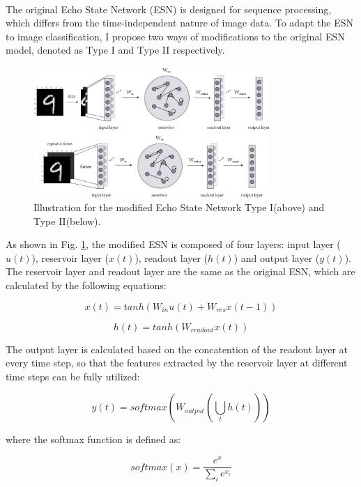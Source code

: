 \documentclass{article}
\newcommand{\upcite}[1]{\textsuperscript{\cite{#1}}} %
\begin{document}
The original Echo State Network \upcite{ESN} (ESN) is designed for sequence processing, which differs from the time-independent nature of 
image data. To adapt the ESN to image classification, I propose two ways of modifications to the original ESN model, 
denoted as Type I and Type II respectively.

\begin{figure}[htbp]
    \centering
    \includegraphics[width=0.8\textwidth]{assets/esn.jpg}
    \caption{Illustration for the modified Echo State Network Type I(above) and Type II(below).}
    \label{fig:esn}
\end{figure}

As shown in Fig. \ref{fig:esn}, the modified ESN is composed of four layers: input layer ($u(t)$), reservoir layer ($x(t)$), 
readout layer ($h(t)$) and output layer ($y(t)$).
The reservoir layer and readout layer are the same as the original ESN, which are calculated by the following equations:

\begin{equation}
    x(t) = tanh(W_{in}u(t) + W_{res}x(t-1))
\end{equation}

\begin{equation}
    h(t) = tanh(W_{readout}x(t))
\end{equation}

The output layer is calculated based on the concatention of the readout layer at every time step, 
so that the features extracted by the reservoir layer at different time steps can be fully utilized:

\begin{equation}
    y(t) = softmax(W_{output}(\bigcup_{t}h(t)))
\end{equation}

where the softmax function is defined as:

\begin{equation}
    softmax(x) = \frac{e^{x}}{\sum_{i}e^{x_i}}
\end{equation}
\end{document}
